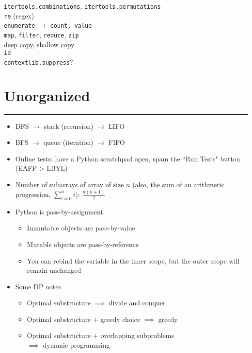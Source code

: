\documentclass[12pt, titlepage]{article}
\begin{document}
\texttt{itertools.combinations}, \texttt{itertools.permutations} \\
\texttt{re} (regex) \\
\texttt{enumerate} $\rightarrow$ \texttt{count, value} \\
\texttt{map}, \texttt{filter}, \texttt{reduce}, \texttt{zip} \\
deep copy, shallow copy \\
\texttt{id} \\
\texttt{contextlib.suppress}?

\section{Unorganized}
\hrule\vspace{5ex}

\begin{itemize}
  \item DFS $\rightarrow$ stack (recursion) $\rightarrow$ LIFO
  \item BFS $\rightarrow$ queue (iteration) $\rightarrow$ FIFO
  \item Online tests: have a Python scratchpad open, spam the ``Run Tests" button (EAFP > LBYL)
  \item Number of subarrays of array of size $n$ (also, the sum of an arithmetic progression, $\sum_{i=0}^{n}i$): $\frac{n(n+1)}{2}$
  \item Python is pass-by-assignment
  \begin{itemize}
    \item Immutable objects are pass-by-value
    \item Mutable objects are pass-by-reference
    \item You can rebind the variable in the inner scope, but the outer scope will remain unchanged
  \end{itemize}
  \item Some DP notes
  \begin{itemize}
    \item Optimal substructure $\implies$ divide and conquer
    \item Optimal substructure + greedy choice $\implies$ greedy
    \item Optimal substructure + overlapping subproblems \\
          \-\hspace{1em}$\implies$ dynamic programming
  \end{itemize}
\end{itemize}
\end{document}
